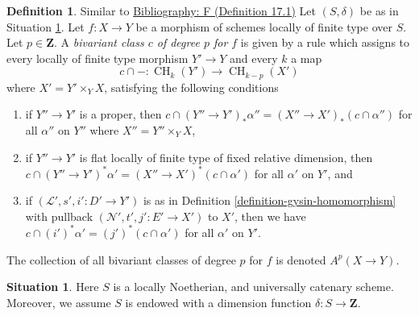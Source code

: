\documentclass{amsart}
\newenvironment{reference}{\comment}{\endcomment}
\theoremstyle{plain}
\theoremstyle{definition}
\newtheorem{definition}[subsection]{Definition}
\newtheorem{situation}[subsection]{Situation}
\theoremstyle{remark}
\numberwithin{equation}{subsection}
\def\CH{\mathop{\mathrm{CH}}\nolimits}
\begin{document}
\begin{definition}
\label{definition-bivariant-class}
\begin{reference}
Similar to \href{https://stacks.math.columbia.edu/bibliography}{Bibliography: F (Definition 17.1)}
\end{reference}
Let $(S, \delta)$ be as in Situation \ref{situation-setup}.
Let $f : X \to Y$ be a morphism of schemes locally of finite type over $S$.
Let $p \in \mathbf{Z}$.
A {\it bivariant class $c$ of degree $p$ for $f$} is given by a rule
which assigns to every locally of finite type morphism $Y' \to Y$
and every $k$ a map
$$
c \cap - : \CH_k(Y') \longrightarrow \CH_{k - p}(X')
$$
where $X' = Y' \times_Y X$, satisfying the following conditions
\begin{enumerate}
\item if $Y'' \to Y'$ is a proper, then
$c \cap (Y'' \to Y')_*\alpha'' = (X'' \to X')_*(c \cap \alpha'')$
for all $\alpha''$ on $Y''$ where $X'' = Y'' \times_Y X$,
\item if $Y'' \to Y'$ is flat locally of finite type of
fixed relative dimension, then
$c \cap (Y'' \to Y')^*\alpha' = (X'' \to X')^*(c \cap \alpha')$
for all $\alpha'$ on $Y'$, and
\item if $(\mathcal{L}', s', i' : D' \to Y')$ is as in
Definition \ref{definition-gysin-homomorphism}
with pullback $(\mathcal{N}', t', j' : E' \to X')$ to $X'$,
then we have $c \cap (i')^*\alpha' = (j')^*(c \cap \alpha')$
for all $\alpha'$ on $Y'$.
\end{enumerate}
The collection of all bivariant classes of degree $p$ for $f$ is
denoted $A^p(X \to Y)$.
\end{definition}

\begin{situation}
\label{situation-setup}
Here $S$ is a locally Noetherian, and universally catenary scheme.
Moreover, we assume $S$ is endowed with a dimension function
$\delta : S \longrightarrow \mathbf{Z}$.
\end{situation}
\end{document}
